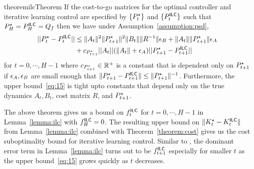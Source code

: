 \begin{restatable}{theorem}{ilcTheorem}
  \label{theorem:ilc}
  If the cost-to-go matrices for the optimal controller and iterative learning
  control are specified by $\{P^\star_{t}\}$ and $\{P^\mathsf{ILC}_{t}\}$ such
  that $P^\star_{H} = P^\mathsf{ILC}_{H} = Q_f$ then we have under
  Assumption~\ref{assumption:psd},
  \begin{align}
    \label{eq:15}
    ||P^\star_{t} - P^\mathsf{ILC}_{t}|| &\leq  \|A_{t}\|^{2}\|P^\star_{t+1}\|^{2}\|B_{t}\|\|R^{-1}\|\epsilon_B
    + \|A_{t}\|\|P^\star_{t+1}\|\epsilon_A \nonumber\\
                        &+ c_{P^\star_{t+1}}||A_{t}||(\|A_{t}\|+ \epsilon_A)||P^\star_{t+1} - P^\mathsf{ILC}_{{t+1}}||
  \end{align}
  for $t=0, \cdots, H-1$ where $c_{P^\star_{t+1}} \in \mathbb{R}^+$ is a
  constant that is dependent only on 
  $P^\star_{t+1}$ if $\epsilon_A, \epsilon_B$ are small enough that $\|P^\star_{t+1}
  - P^\mathsf{ILC}_{t+1}\| \leq \|P^\star_{t+1}\|^{-1}$. Furthermore, the upper bound~\eqref{eq:15} is tight
  upto constants that depend only on the true dynamics $A_t, B_t$,
  cost matrix $R$, and $P^\star_{t+1}$. 
\end{restatable}
The above theorem gives us a bound on $f^\mathsf{ILC}_t$ for $t=0, \cdots, H-1$
in Lemma~\ref{lemma:ilc} with $f^\mathsf{ILC}_H = 0$. The resulting upper bound
on $\|K^\star_t - K^\mathsf{ILC}_t\|$ from Lemma~\ref{lemma:ilc} combined with
Theorem~\ref{theorem:cost} gives us the cost suboptimality bound for
iterative learning control. Similar to \MM{}, the dominant error term in
Lemma~\ref{lemma:ilc} turns out to be $f^\mathsf{ILC}_{t+1}$ especially for
smaller $t$ as the upper bound~\eqref{eq:15} grows quickly as $t$ decreases.



